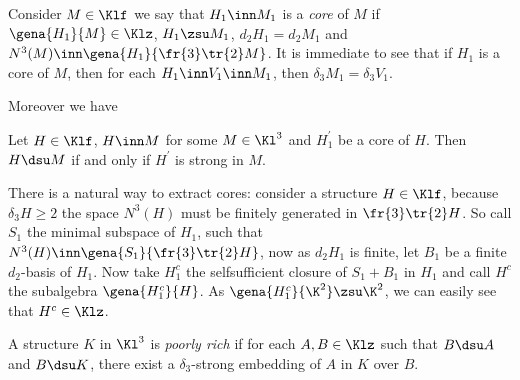 Consider  $M\in\Klf$ we say that $H_{1}\inn M_{1}$ is a \emph{core} of $M$ if $\gena{H_{1}}{M}\in\Klz$,
$H_{1}\zsu M_{1}$, $d_{2}H_{1}=d_{2}M_{1}$ and $N^{3}(M)\inn\gena{H_{1}}{\fr{3}\tr{2}M}$.
It is immediate to see that if $H_{1}$ is a core of $M$, then for each $H_{1}\inn V_{1}\inn M_{1}$, then
$\delta_{3}M_{1}=\delta_{3}V_{1}$.

Moreover we have
\begin{lem}\label{chistocore}
Let $H\in\Klf$, $H\inn M$ for some $M\in\Kl^{3}$ and $H_{1}^{\prime}$ be a core of $H$.
Then $H\dsu M$ if and only if $H^{\prime}$ is strong in $M$.
\end{lem}

There is a natural way to extract cores: consider a structure $H\in\Klf$, because $\delta_{3}H\geq2$ the space $N^{3}(H)$ must
be finitely generated in $\fr{3}\tr{2}H$. So call $S_{1}$ the minimal subspace of $H_{1}$,
such that $N^{3}(H)\inn\gena{S_{1}}{\fr{3}\tr{2}H}$, now as $d_{2}H_{1}$ is finite, let $B_{1}$
be a finite $d_{2}$-basis of $H_{1}$. Now take $H^{c}_{1}$ the selfsufficient closure of $S_{1}+B_{1}$
in $H_{1}$ and call $H^{c}$ the subalgebra $\gena{H^{c}_{1}}{H}$. As $\gena{H^{c}_{1}}{\K^{2}}\zsu\K^{2}$,
we can easily see that $H^{c}\in\Klz$. %

\begin{dfn}
A structure $K$ in $\Kl^{3}$ is \emph{poorly rich} if for each $A,B\in\Klz$ such that $B\dsu A$ and $B\dsu K$,
there exist a $\delta_{3}$-strong embedding of $A$ in $K$ over $B$.
\end{dfn}

